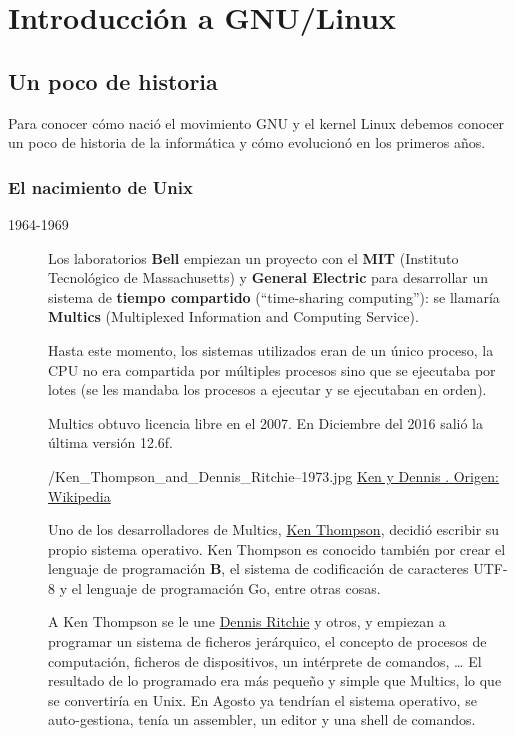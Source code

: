 \chapter{Introducción a GNU/Linux}
\section{Un poco de historia}
Para conocer cómo nació el movimiento GNU y el kernel Linux debemos conocer un poco de historia de la informática y cómo evolucionó en los primeros años.

\subsection{El nacimiento de Unix}

\begin{description}
\item[1964-1969]Los laboratorios \textbf{Bell} empiezan un proyecto con el \textbf{MIT} (Instituto Tecnológico de Massachusetts) y \textbf{General Electric} para desarrollar un sistema de \textbf{tiempo compartido} (“time-sharing computing”): se llamaría \textbf{Multics} (Multiplexed Information and Computing Service).

Hasta este momento, los sistemas utilizados eran de un único proceso, la CPU no era compartida por múltiples procesos sino que se ejecutaba por lotes (se les mandaba los procesos a ejecutar y se ejecutaban en orden).

Multics obtuvo licencia libre en el 2007. En Diciembre del 2016 salió la última versión 12.6f.

  {/Ken_Thompson_and_Dennis_Ritchie--1973.jpg}
  {\href{https://en.wikipedia.org/wiki/Ken_Thompson}{Ken y Dennis . Origen: Wikipedia}}
  {
  Uno de los desarrolladores de Multics, \href{https://en.wikipedia.org/wiki/Ken_Thompson}{Ken Thompson}, decidió escribir su propio sistema operativo. Ken Thompson es conocido también por crear el lenguaje de programación \textbf{B}, el sistema de codificación de caracteres UTF-8 y el lenguaje de programación Go, entre otras cosas.

A Ken Thompson se le une \href{https://en.wikipedia.org/wiki/Dennis_Ritchie}{Dennis Ritchie} y otros, y empiezan a programar un sistema de ficheros jerárquico, el concepto de procesos de computación, ficheros de dispositivos, un intérprete de comandos, … El resultado de lo programado era más pequeño y simple que Multics, lo que se convertiría en Unix. En Agosto ya tendrían el sistema operativo, se auto-gestiona,  tenía un assembler, un editor y una shell de comandos.

}
\end{description}
